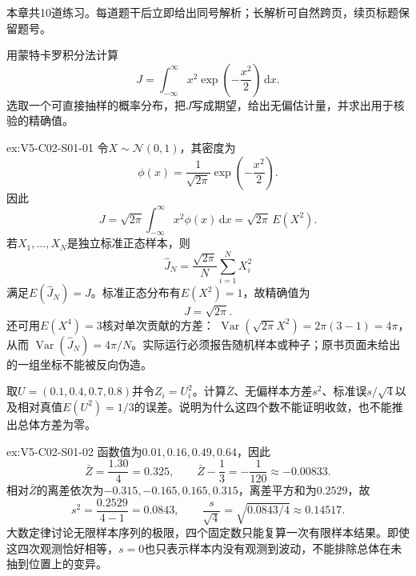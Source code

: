 \label{struct:V5-C02-CH34}
\begin{chapterexercisebox}
\label{struct:V5-C02-CH35}
本章共10道练习。每道题干后立即给出同号解析；长解析可自然跨页，续页标题保留题号。
\end{chapterexercisebox}

\begin{SLChapterExercisePairSection}

\SLSourceBookExercises

\begin{exercise}\label{ex:V5-C02-S01-01}
用蒙特卡罗积分法计算
\[
J=\int_{-\infty}^{\infty}x^2\exp\!\left(-\frac{x^2}{2}\right)\,\mathrm dx.
\]
选取一个可直接抽样的概率分布，把$J$写成期望，给出无偏估计量，并求出用于核验的精确值。
\end{exercise}
\ifSLFullEdition
{}\label{sol:V5-C02-S01-01}
\begin{chapterexercisesolution}{ex:V5-C02-S01-01}
令$X\sim\mathcal N(0,1)$，其密度为
\[
\phi(x)=\frac1{\sqrt{2\pi}}\exp\!\left(-\frac{x^2}{2}\right).
\]
因此
\[
J=\sqrt{2\pi}\int_{-\infty}^{\infty}x^2\phi(x)\,\mathrm dx
=\sqrt{2\pi}\,E(X^2).
\]
若$X_1,\ldots,X_N$是独立标准正态样本，则
\[
\widehat J_N=\frac{\sqrt{2\pi}}{N}\sum_{i=1}^NX_i^2
\]
满足$E(\widehat J_N)=J$。标准正态分布有$E(X^2)=1$，故精确值为
\[
J=\sqrt{2\pi}.
\]
还可用$E(X^4)=3$核对单次贡献的方差：
$\operatorname{Var}(\sqrt{2\pi}X^2)=2\pi(3-1)=4\pi$，从而
$\operatorname{Var}(\widehat J_N)=4\pi/N$。实际运行必须报告随机样本或种子；原书页面未给出的一组坐标不能被反向伪造。
\end{chapterexercisesolution}
\fi

\SLLectureSupplementExercises

\begin{exercise}\label{ex:V5-C02-S01-02}
取$U=(0.1,0.4,0.7,0.8)$并令$Z_i=U_i^2$。计算$\bar Z$、无偏样本方差$s^2$、标准误$s/\sqrt4$以及相对真值$E(U^2)=1/3$的误差。说明为什么这四个数不能证明收敛，也不能推出总体方差为零。
\end{exercise}
\ifSLFullEdition
{}\label{sol:V5-C02-S01-02}
\begin{chapterexercisesolution}{ex:V5-C02-S01-02}
函数值为$0.01,0.16,0.49,0.64$，因此
\[
\bar Z=\frac{1.30}{4}=0.325,
\qquad
\bar Z-\frac13=-\frac1{120}\approx-0.00833.
\]
相对$\bar Z$的离差依次为$-0.315,-0.165,0.165,0.315$，离差平方和为$0.2529$，故
\[
s^2=\frac{0.2529}{4-1}=0.0843,
\qquad
\frac{s}{\sqrt4}=\sqrt{0.0843/4}\approx0.14517.
\]
大数定律讨论无限样本序列的极限，四个固定数只能复算一次有限样本结果。即使这四次观测恰好相等，$s=0$也只表示样本内没有观测到波动，不能排除总体在未抽到位置上的变异。
\end{chapterexercisesolution}
\fi


\end{SLChapterExercisePairSection}
